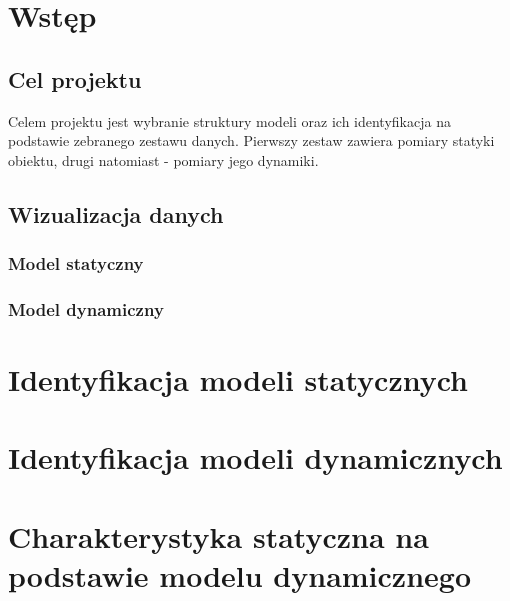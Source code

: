 \section{Wstęp}
\subsection{Cel projektu}
Celem projektu jest wybranie struktury modeli oraz ich identyfikacja na podstawie zebranego zestawu danych. Pierwszy zestaw zawiera pomiary statyki obiektu, drugi natomiast - pomiary jego dynamiki.
\subsection{Wizualizacja danych}
\subsubsection{Model statyczny}
\subsubsection{Model dynamiczny}
\section{Identyfikacja modeli statycznych}
\section{Identyfikacja modeli dynamicznych}
\section{Charakterystyka statyczna na podstawie modelu dynamicznego}
